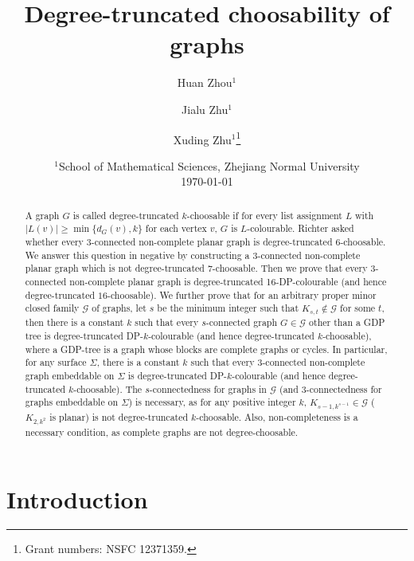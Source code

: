 \documentclass[11pt,a4paper]{article}
\theoremstyle{definition}
\begin{document}
	\title{ Degree-truncated choosability of  graphs}
	\author{Huan Zhou$^1$ \and Jialu Zhu$^1$ \and Xuding Zhu$^1$\thanks{Grant numbers: NSFC 12371359. }}
\date{%
    $^1$School of Mathematical Sciences, Zhejiang Normal University\\[2ex]%
    \today
}
	\maketitle 
	\begin{abstract}
 A graph $G$ is called degree-truncated $k$-choosable if for every list assignment $L$ with 
  $|L(v)| \ge \min\{d_G(v), k\}$ for each vertex $v$, $G$ is $L$-colourable. Richter asked whether every 3-connected non-complete planar graph is degree-truncated 6-choosable. We answer this question in negative by constructing a 3-connected non-complete planar graph which is not degree-truncated 7-choosable. Then we prove that every 3-connected non-complete planar graph is degree-truncated 16-DP-colourable (and hence degree-truncated $16$-choosable).  We further prove that for an arbitrary proper minor closed family ${\mathcal G}$ of graphs, let $s$ be the minimum integer such that   $K_{s,t} \notin \mathcal{G}$ for some $t$, then there is a constant $k$ such that every $s$-connected graph $G \in  {\mathcal G}$ other than a GDP tree is degree-truncated DP-$k$-colourable (and hence degree-truncated $k$-choosable), where a GDP-tree is a graph whose blocks are complete graphs or cycles.
  In particular, for any surface $\Sigma$, there is a constant $k$ such that every 3-connected non-complete graph embeddable on $\Sigma$ is  degree-truncated DP-$k$-colourable (and hence degree-truncated $k$-choosable).   The $s$-connectedness for graphs in $\mathcal{G}$ (and 3-connectedness for   graphs embeddable on $\Sigma$) is   necessary, as for any positive integer $k$, $K_{s-1,k^{s-1}} \in \mathcal{G}$ ($K_{2,k^2}$ is planar)  is not degree-truncated $k$-choosable. Also, non-completeness is a necessary condition, as complete graphs are not degree-choosable. 
	\end{abstract}
	
	\section{Introduction}	
	
\end{document}
